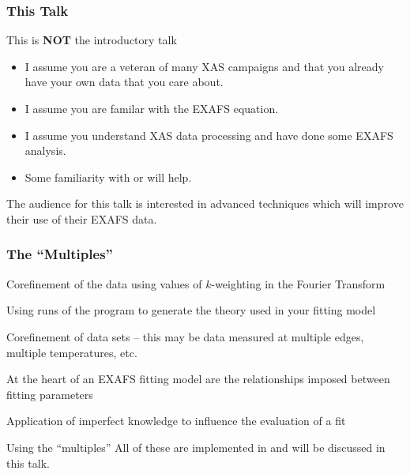 \documentclass[10pt, xcolor=x11names, compress]{beamer}
\begin{document}
\begin{frame}
  \frametitle{This Talk}
  
  \begin{block}{This is \textbf{NOT} the introductory talk}
    \begin{itemize}
    \item I assume you are a veteran of many XAS campaigns and that
      you already have your own data that you care about.
    \item I assume you are familar with the EXAFS equation.
    \item I assume you understand XAS data processing and have done
      some EXAFS analysis.
    \item Some familiarity with {\ifeffit} or {\artemis} will help.
    \end{itemize}
  \end{block}

  \bigskip

  \begin{alertblock}{}
    \begin{center}
      The audience for this talk is interested in advanced techniques
      which will improve their use of their EXAFS data.
    \end{center}
  \end{alertblock}
\end{frame}

\begin{frame}[label=themultiples]
  \frametitle{The ``Multiples''}
  \begin{description}[Multiple]
  \item[Multiple $k$-weight] Corefinement of the data using {\multiple}
    values of $k$-weighting in the Fourier Transform
  \item[Multiple Feff Calculations] Using {\multiple} runs of the
    {\feff} program to generate the theory used in your fitting
    model
  \item[Multiple Data Sets] Corefinement of {\multiple} data sets --
    this may be data measured at multiple edges, multiple
    temperatures, etc.
  \item[Constraints Between Parameters] At the heart of an EXAFS
    fitting model are the relationships imposed between fitting
    parameters
  \item[Restraints on Parameters] Application of imperfect knowledge
    to influence the evaluation of a fit
  \end{description}
  \begin{block}{Using the ``multiples''}
    All of these are implemented in {\artemis} and will be
    discussed in this talk.
  \end{block}
\end{frame}
\end{document}
